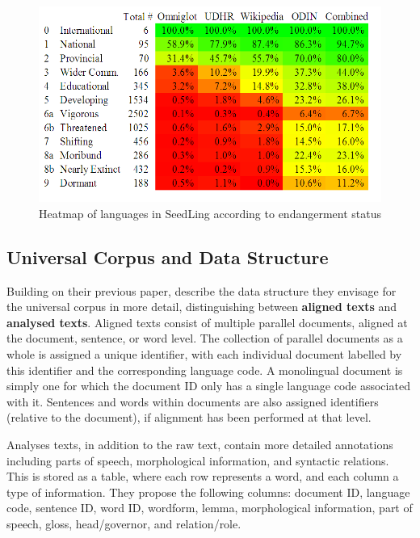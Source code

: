 \begin{figure}[t]
\begin{centering}
\includegraphics[scale=0.63]{heatmap-numbers.png}
\caption{Heatmap of languages in SeedLing according to endangerment status}\label{fig:heatmap}
\end{centering}
\end{figure}


\subsection{Universal Corpus and Data Structure} \label{sec:structure}

Building on their previous paper,  describe the data structure they envisage for the universal corpus in more detail, distinguishing between \textbf{aligned texts} and \textbf{analysed texts}. Aligned texts consist of multiple parallel documents, aligned at the document, sentence, or word level. The collection of parallel documents as a whole is assigned a unique identifier, with each individual document labelled by this identifier and the corresponding language code.  A monolingual document is simply one for which the document ID only has a single language code associated with it.  Sentences and words within documents are also assigned identifiers (relative to the document), if alignment has been performed at that level.

Analyses texts, in addition to the raw text, contain more detailed annotations including parts of speech, morphological information, and syntactic relations.  This is stored as a table, where each row represents a word, and each column a type of information.  They propose the following columns: document ID, language code, sentence ID, word ID, wordform, lemma, morphological information, part of speech, gloss, head/governor, and relation/role.

